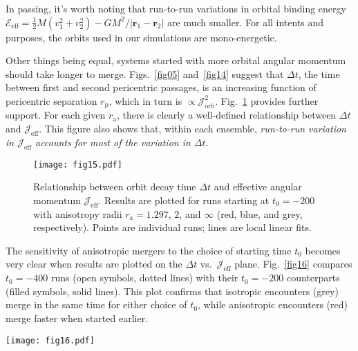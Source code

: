 \documentclass[fleqn,usenatbib]{mnras}
\begin{document}
In passing, it's worth noting that run-to-run variations in orbital binding energy $\mathcal{E}_\mathrm{eff} = \frac{1}{2} M (v_{1}^2 + v_{2}^2) - G M^2 / | \mathbf{r}_{1} - \mathbf{r}_{2} |$ are much smaller. For all intents and purposes, the orbits used in our simulations are mono-energetic.

Other things being equal, systems started with more orbital angular momentum should take longer to merge. Figs.~\ref{fig05} and~\ref{fig14} suggest that $\Delta t$, the time between first and second pericentric passages, is an increasing function of pericentric separation $r_\mathrm{p}$, which in turn is $\propto \mathcal{J}_\mathrm{orb}^2$. Fig.~\ref{fig15} provides further support. For each given $r_\mathrm{a}$, there is clearly a well-defined relationship between $\Delta t$ and $\mathcal{J}_\mathrm{eff}$. This figure also shows that, within each ensemble, \textit{run-to-run variation in $\mathcal{J}_\mathrm{eff}$ accounts for most of the variation in $\Delta t$.}

\begin{figure}
    \centering
    \texttt{[image: fig15.pdf]}
    \caption{Relationship between orbit decay time $\Delta t$ and effective angular momentum $\mathcal{J}_\mathrm{eff}$.  Results are plotted for runs starting at $t_{0} = -200$ with anisotropy radii $r_\mathrm{a} = 1.297$, $2$, and $\infty$ (red, blue, and grey, respectively).  Points are individual runs; lines are local linear fits.}
    \label{fig15}
\end{figure}

The sensitivity of anisotropic mergers to the choice of starting time $t_{0}$ becomes very clear when results are plotted on the $\Delta t$ vs.~$\mathcal{J}_\mathrm{eff}$ plane. Fig.~\ref{fig16} compares $t_{0} = -400$ runs (open symbols, dotted lines) with their $t_{0} = -200$ counterparts (filled symbols, solid lines). This plot confirms that isotropic encounters (grey) merge in the same time for either choice of $t_{0}$, while anisotropic encounters (red) merge faster when started earlier. 

\begin{figure*}
    \centering
    \texttt{[image: fig16.pdf]}
    \caption{Effect of starting time on the relationship between $\Delta t$ and $\mathcal{J}_\mathrm{eff}$. Filled symbols and solid lines represent $t_{0} = -200$ runs; open symbols and dotted lines represent $t_{0} = -400$ runs.}
    \label{fig16}
\end{figure*}
\end{document}
